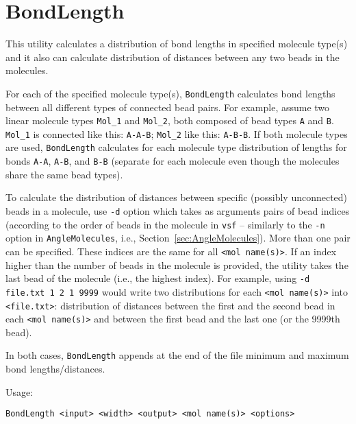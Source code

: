 \section{BondLength} \label{sec:BondLength}

This utility calculates a distribution of bond lengths in specified
molecule type(s) and it also can calculate distribution of distances
between any two beads in the molecules.

For each of the specified molecule type(s), \texttt{BondLength} calculates
bond lengths between all different types of connected bead pairs.
For example, assume two linear molecule types \texttt{Mol\_1} and
\texttt{Mol\_2}, both composed of bead types \texttt{A} and \texttt{B}.
\texttt{Mol\_1} is connected like this: \texttt{A-A-B}; \texttt{Mol\_2}
like this: \texttt{A-B-B}. If both molecule types are used,
\texttt{BondLength} calculates for each molecule type distribution of
lengths for bonds \texttt{A-A}, \texttt{A-B}, and \texttt{B-B} (separate
for each molecule even though the molecules share the same bead types).

To calculate the distribution of distances between specific (possibly
unconnected) beads in a molecule, use \texttt{-d} option which takes as
arguments pairs of bead indices (according to the order of beads in the
molecule in \texttt{vsf} -- similarly to the \texttt{-n} option in
\texttt{AngleMolecules}, i.e., Section~\ref{sec:AngleMolecules}). More than
one pair can be specified.  These indices are the same for all \texttt{<mol
name(s)>}. If an index higher than the number of beads in the molecule is
provided, the utility takes the last bead of the molecule (i.e., the
highest index). For example, using \texttt{-d file.txt 1 2 1 9999} would
write two distributions for each \texttt{<mol name(s)>} into
\texttt{<file.txt>}: distribution of distances between the first and the
second bead in each \texttt{<mol name(s)>} and between the first bead and
the last one (or the 9999th bead).

In both cases, \texttt{BondLength} appends at the end of the file minimum and
maximum bond lengths/distances.

Usage:

\vspace{1em}
\noindent
\texttt{BondLength <input> <width> <output> <mol name(s)> <options>}

